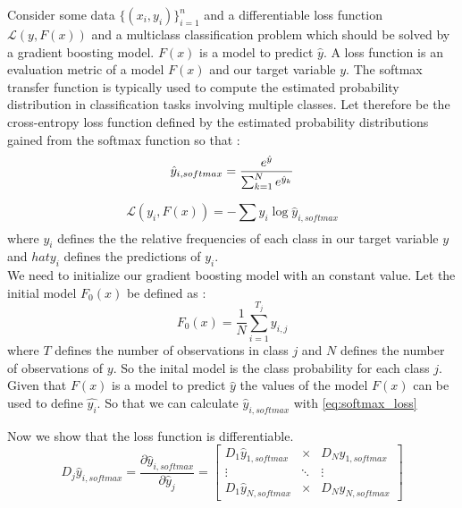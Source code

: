 \documentclass[12pt,a4paper,onecolumn,oneside,draft=on]{article}
\begin{document}
Consider some data  $\{(x_i,y_i)\}^n_{i=1}$ and a differentiable loss function $\mathcal{L}(y,F(x))$ and a multiclass classification problem which should be solved by a gradient boosting model.  $F(x)$ is a model to predict $\hat{y}$. A loss function is an evaluation metric of a model $F(x)$ and our target variable $y$. 
The softmax transfer function is typically used to compute the estimated probability distribution in classification tasks involving multiple classes.
Let therefore be the cross-entropy loss function defined by the estimated probability distributions gained from the softmax function so that :
\begin{equation}
\hat{y}_{i,softmax} = \dfrac{e^{\hat{y}}}{\sum_{k=1}^N e^{\hat{y}_k}} \\
\label{eq:softmax_loss}
\end{equation}

\begin{equation}
\mathcal{L}(y_i,F(x)) = -\sum_{} y_i \log \hat{y}_{i,softmax}
\end{equation}
where $y_i$ defines the the relative frequencies of each class in our target variable $y$ and $hat{y_i}$ defines the predictions of $y_i$.\\
We need to initialize our gradient boosting model with an constant value. Let the initial model $F_0(x)$ be defined as :
\begin{equation}
F_{0}(x)= \dfrac{1}{N} \sum_{i=1}^{T_j} y_{i,j}  
\end{equation} where $T$ defines the number of observations in class $j$ and $N$ defines the number of observations of $y$. So the inital model is the class probability for each class $j$. Given that $F(x)$ is a model to predict $\hat{y}$ the values of the model $F(x)$ can be used to define $\hat{y_i}$. So that we can calculate $\hat{y}_{i,softmax}$ with \ref{eq:softmax_loss}

Now we show that the loss function is differentiable.
\begin{equation}
D_j\hat{y}_{i,softmax} = \dfrac{\partial \hat{y}_{i,softmax}}{\partial \hat{y}_j} = \left[\begin{array}{rll}
D_{1} \hat{y}_{1,softmax} & \times & D_{N}\hat{y}_{1,softmax} \\
\vdots & \ddots & \vdots \\
D_{1}\hat{y}_{N,softmax} & \times & D_{N} \hat{y}_{N,softmax}
\end{array}\right]
\label{eq:dsoftmax}
\end{equation}
\end{document}

